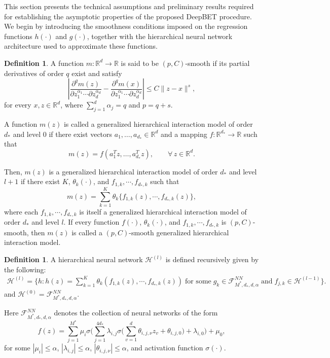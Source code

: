 \documentclass[12pt,reqno,oneside]{amsbook}
\theoremstyle{definition}
\newtheorem{definition}[theorem]{Definition}
\theoremstyle{remark}
\begin{document}
This section presents the technical assumptions and preliminary results required for establishing the asymptotic properties of the proposed DeepBET procedure. We begin by introducing the smoothness conditions imposed on the regression functions $h(\cdot)$ and $g(\cdot)$, together with the hierarchical neural network architecture used to approximate these functions.

\begin{definition}
A function $m:\mathbb{R}^d\rightarrow\mathbb{R}$ is said to be $(p,C)$-smooth if its partial derivatives of order $q$ exist and satisfy
\[
\left|
\frac{\partial^q m(z)}
{\partial z_1^{\alpha_1}\cdots\partial z_d^{\alpha_d}}
-
\frac{\partial^q m(x)}
{\partial z_1^{\alpha_1}\cdots\partial z_d^{\alpha_d}}
\right|
\le
C\|z-x\|^s,
\]
for every $x,z\in\mathbb{R}^d$, where
$\sum_{j=1}^d\alpha_j=q$ and $p=q+s$.

A function $m(z)$ is called a generalized hierarchical interaction model of order $d_*$ and level $0$ if there exist vectors
$a_1,\ldots,a_{d_*}\in\mathbb{R}^d$
and a mapping
$f:\mathbb{R}^{d_*}\rightarrow\mathbb{R}$
such that
\[
m(z)=f(a_1^Tz,\ldots,a_{d_*}^Tz),
\qquad
\forall\,z\in\mathbb{R}^d.
\]

Then, $m(z)$ is a generalized hierarchical interaction model of order $d_*$ and level $l+1$ if there exist $K$, $\theta_k(\cdot)$, and $f_{1,k},\cdots,f_{d_*,k}$ such that
\[
m(z)
=
\sum_{k=1}^K
\theta_k
\{f_{1,k}(z),\cdots,f_{d_*,k}(z)\},
\]
where each
$f_{1,k},\cdots,f_{d_*,k}$
is itself a generalized hierarchical interaction model of order $d_*$ and level $l$. If every function
$f(\cdot)$,
$\theta_k(\cdot)$,
and
$f_{1,k},\cdots,f_{d_*,k}$
is $(p,C)$-smooth, then
$m(z)$
is called a $(p,C)$-smooth generalized hierarchical interaction model.
\end{definition}

\begin{definition}
\label{hnn}
A hierarchical neural network $\mathcal{H}^{(l)}$ is defined recursively given by the following:
\begin{align*}
\mathcal{H}^{(l)}
=
\{
h:
h(z)
=
\sum_{k=1}^K
\theta_k(f_{1,k}(z),\cdots,f_{d_*,k}(z))
\;
\mbox{for some}
\;
g_k\in\mathcal{F}_{M^*,d_*,d,\alpha}^{NN}
\;
\mbox{and}
\;
f_{j,k}\in\mathcal{H}^{(l-1)}
\}.
\end{align*}
and
$\mathcal{H}^{(0)}=\mathcal{F}_{M^*,d_*,d,\alpha}^{NN}$.

Here
$\mathcal{F}_{M^*,d_*,d,\alpha}^{NN}$
denotes the collection of neural networks of the form
$$
f(z)
=
\sum_{j=1}^{M^*}
\mu_i
\sigma
\Big(
\sum_{j=1}^{4d_*}
\lambda_{i,j}
\sigma
\Big(
\sum_{v=1}^d
\theta_{i,j,\nu}z_v+\theta_{i,j,0}
\Big)
+\lambda_{i,0}
\Big)
+\mu_0,
$$
for some
$|\mu_i|\leq\alpha$,
$|\lambda_{i,j}|\leq\alpha$,
$|\theta_{i,j,\nu}|\leq\alpha$,
and activation function
$\sigma(\cdot)$.
\end{definition}
\end{document}
